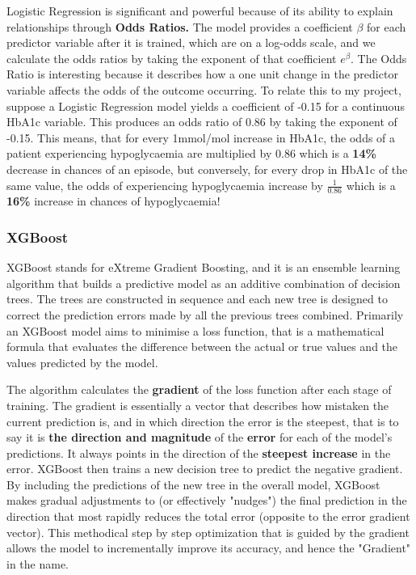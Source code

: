 	\vspace{5pt}
	\noindent Logistic Regression is significant and powerful because of its ability to explain relationships through \textbf{Odds Ratios.} The model provides a coefficient  \(\beta\)  for each predictor variable after it is trained, which are on a log-odds scale, and we calculate the odds ratios by taking the exponent of that coefficient $e^{\beta}$. The Odds Ratio is interesting because it describes how a one unit change in the predictor variable affects the odds of the outcome occurring. To relate this to my project, suppose a Logistic Regression model yields a coefficient of -0.15 for a continuous HbA1c variable. This produces an odds ratio of 0.86 by taking the exponent of -0.15. This means, that for every 1mmol/mol increase in HbA1c, the odds of a patient experiencing hypoglycaemia are multiplied by 0.86 which is a \textbf{14\%} decrease in chances of an episode, but conversely, for every drop in HbA1c of the same value, the odds of experiencing hypoglycaemia increase by $\frac{1}{0.86}$ which is a \textbf{16\%} increase in chances of hypoglycaemia! 

	\subsubsection{XGBoost}
	XGBoost stands for eXtreme Gradient Boosting, and it is an ensemble learning algorithm that builds a predictive model as an additive combination of decision trees. The trees are constructed in sequence and each new tree is designed to correct the prediction errors made by all the previous trees combined. Primarily an XGBoost model aims to minimise a loss function, that is a mathematical formula that evaluates the difference between the actual or true values and the values predicted by the model.
	
	\vspace{5pt}
	\noindent The algorithm calculates the \textbf{gradient} of the loss function after each stage of training. The gradient is essentially a vector that describes how mistaken the current prediction is, and in which direction the error is the steepest, that is to say it is \textbf{the direction and magnitude} of the \textbf{error} for each of the model's predictions. It always points in the direction of the \textbf{steepest increase} in the error. XGBoost then trains a new decision tree to predict the negative gradient. By including the predictions of the new tree in the overall model, XGBoost makes gradual adjustments to (or effectively "nudges") the final prediction in the direction that most rapidly reduces the total error (opposite to the error gradient vector). This methodical step by step optimization that is guided by the gradient allows the model to incrementally improve its accuracy, and hence the "Gradient" in the name.
	

